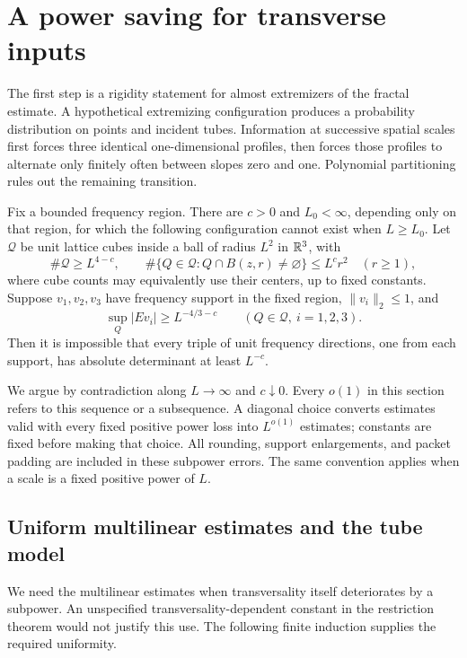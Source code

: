 \section{A power saving for transverse inputs}
\label{sec:transverse}

The first step is a rigidity statement for almost extremizers of the
fractal estimate.  A hypothetical extremizing configuration produces a
probability distribution on points and incident tubes.  Information at
successive spatial scales first forces three identical one-dimensional
profiles, then forces those profiles to alternate only finitely often
between slopes zero and one.  Polynomial partitioning rules out the
remaining transition.

\begin{proposition}\label{prop:transverse}
Fix a bounded frequency region.  There are $c>0$ and $L_0<\infty$,
depending only on that region, for which the following configuration
cannot exist when $L\ge L_0$.  Let $\mathcal Q$ be unit lattice cubes
inside a ball of radius $L^2$ in $\mathbb R^3$, with
\[
 \#\mathcal Q\ge L^{4-c},\qquad
 \#\{Q\in\mathcal Q:Q\cap B(z,r)\ne\varnothing\}
       \le L^c r^2\quad(r\ge1),
\]
where cube counts may equivalently use their centers, up to fixed
constants.  Suppose $v_1,v_2,v_3$ have frequency support in the
fixed region, $\|v_i\|_2\le1$, and
\[
 \sup_Q|Ev_i|\ge L^{-4/3-c}
 \qquad(Q\in\mathcal Q,\ i=1,2,3).
\]
Then it is impossible that every triple of unit frequency directions,
one from each support, has absolute determinant at least $L^{-c}$.
\end{proposition}

We argue by contradiction along $L\to\infty$ and $c\downarrow0$.
Every $o(1)$ in this section refers to this sequence or a subsequence.
A diagonal choice converts estimates valid with every fixed positive
power loss into $L^{o(1)}$ estimates; constants are fixed before making
that choice.  All rounding, support enlargements, and packet padding
are included in these subpower errors.  The same convention applies
when a scale is a fixed positive power of $L$.

\subsection{Uniform multilinear estimates and the tube model}

We need the multilinear estimates when transversality itself deteriorates
by a subpower.  An unspecified transversality-dependent constant in the
restriction theorem would not justify this use.  The following finite
induction supplies the required uniformity.

